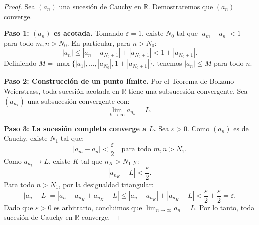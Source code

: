 \documentclass[11pt,a4paper]{article}
\theoremstyle{plain}
\theoremstyle{definition}
\begin{document}
\begin{proof}
Sea $(a_n)$ una sucesión de Cauchy en $\mathbb{R}$. Demostraremos que $(a_n)$ converge.

\textbf{Paso 1: $(a_n)$ es acotada.}
Tomando $\varepsilon = 1$, existe $N_0$ tal que $|a_m - a_n| < 1$ para todo $m, n > N_0$. En particular, para $n > N_0$:
\[
|a_n| \leq |a_n - a_{N_0+1}| + |a_{N_0+1}| < 1 + |a_{N_0+1}|.
\]
Definiendo $M = \max\{|a_1|, \ldots, |a_{N_0}|, 1 + |a_{N_0+1}|\}$, tenemos $|a_n| \leq M$ para todo $n$.

\textbf{Paso 2: Construcción de un punto límite.}
Por el Teorema de Bolzano-Weierstrass, toda sucesión acotada en $\mathbb{R}$ tiene una subsucesión convergente. Sea $(a_{n_k})$ una subsucesión convergente con:
\[
\lim_{k\to\infty} a_{n_k} = L.
\]

\textbf{Paso 3: La sucesión completa converge a $L$.}
Sea $\varepsilon > 0$. Como $(a_n)$ es de Cauchy, existe $N_1$ tal que:
\[
|a_m - a_n| < \frac{\varepsilon}{2} \quad \text{para todo } m, n > N_1.
\]
Como $a_{n_k} \to L$, existe $K$ tal que $n_K > N_1$ y:
\[
|a_{n_K} - L| < \frac{\varepsilon}{2}.
\]
Para todo $n > N_1$, por la desigualdad triangular:
\[
|a_n - L| = |a_n - a_{n_K} + a_{n_K} - L| \leq |a_n - a_{n_K}| + |a_{n_K} - L| < \frac{\varepsilon}{2} + \frac{\varepsilon}{2} = \varepsilon.
\]
Dado que $\varepsilon > 0$ es arbitrario, concluimos que $\lim_{n\to\infty} a_n = L$. Por lo tanto, toda sucesión de Cauchy en $\mathbb{R}$ converge.
\end{proof}
\end{document}
